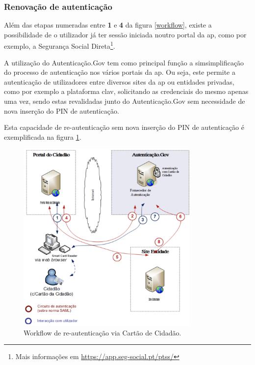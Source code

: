 \cleardoublepage
\subsubsection{Renovação de autenticação} \label{renovacaoAuth}

Além das etapas numeradas entre \textbf{1} e \textbf{4} da figura \ref{workflow}, existe a possibilidade de o utilizador já ter sessão iniciada noutro portal da \gls{ap}, como por exemplo, a Segurança Social Direta\footnote{Mais informações em \url{https://app.seg-social.pt/ptss/}}.

A utilização do Autenticação.Gov tem como principal função a simsimplificação do processo de autenticação nos vários portais da \gls{ap}. Ou seja, este permite a autenticação de utilizadores entre diversos sites da \gls{ap} ou entidades privadas, como por exemplo a plataforma \gls{clav}, solicitando as credenciais do mesmo apenas uma vez, sendo estas revalidadas junto do Autenticação.Gov sem necessidade de nova inserção do PIN de autenticação.

Esta capacidade de re-autenticação sem nova inserção do PIN de autenticação é exemplificada na figura \ref{workflow2}.

\begin{figure}[h]
    \centering
    \includegraphics[width=0.8\textwidth]{img/authgov/workflow2.png}
    \caption{Workflow de re-autenticação via Cartão de Cidadão.}
    \label{workflow2}
\end{figure}

